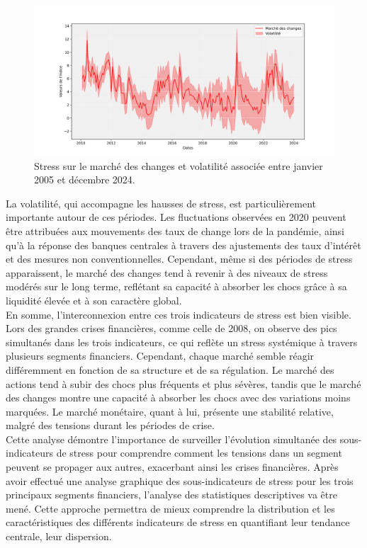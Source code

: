 \begin{sloppypar}
\begin{figure}[H]
    \centering
    \includegraphics[width=1\linewidth]{figures/sous_indicateurs_forex_stress_forex.png}
    \caption{Stress sur le marché des changes et volatilité associée entre janvier 2005 et décembre 2024.}
    \label{fig:enter-label}
\end{figure}

La volatilité, qui accompagne les hausses de stress, est particulièrement importante autour de ces périodes. Les fluctuations observées en 2020 peuvent être attribuées aux mouvements des taux de change lors de la pandémie, ainsi qu'à la réponse des banques centrales à travers des ajustements des taux d'intérêt et des mesures non conventionnelles. Cependant, même si des périodes de stress apparaissent, le marché des changes tend à revenir à des niveaux de stress modérés sur le long terme, reflétant sa capacité à absorber les chocs grâce à sa liquidité élevée et à son caractère global.\\

En somme, l'interconnexion entre ces trois indicateurs de stress est bien visible. Lors des grandes crises financières, comme celle de 2008, on observe des pics simultanés dans les trois indicateurs, ce qui reflète un stress systémique à travers plusieurs segments financiers. Cependant, chaque marché semble réagir différemment en fonction de sa structure et de sa régulation. Le marché des actions tend à subir des chocs plus fréquents et plus sévères, tandis que le marché des changes montre une capacité à absorber les chocs avec des variations moins marquées. Le marché monétaire, quant à lui, présente une stabilité relative, malgré des tensions durant les périodes de crise.\\

Cette analyse démontre l'importance de surveiller l'évolution simultanée des sous-indicateurs de stress pour comprendre comment les tensions dans un segment peuvent se propager aux autres, exacerbant ainsi les crises financières. Après avoir effectué une analyse graphique des sous-indicateurs de stress pour les trois principaux segments financiers, l'analyse des statistiques descriptives va être mené. Cette approche permettra de mieux comprendre la distribution et les caractéristiques des différents indicateurs de stress en quantifiant leur tendance centrale, leur dispersion.


\end{sloppypar}
